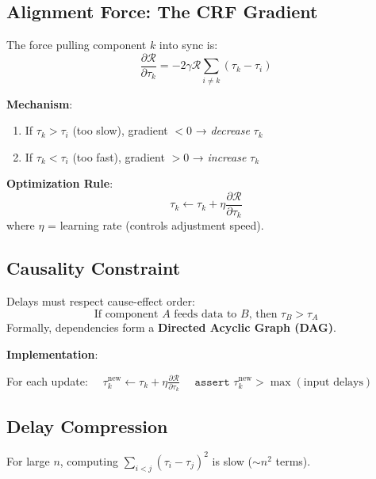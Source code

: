 \subsection{Alignment Force: The CRF Gradient}  
\begin{definition}  
The force pulling component $k$ into sync is:  
\[  
\frac{\partial \mathcal{R}}{\partial \tau_k} = -2\gamma \mathcal{R} \sum_{i \neq k} (\tau_k - \tau_i)  
\]  
\end{definition}  

\textbf{Mechanism}:  
\begin{enumerate}  
\item If $\tau_k > \tau_i$ (too slow), gradient $<0$ → \textit{decrease} $\tau_k$  
\item If $\tau_k < \tau_i$ (too fast), gradient $>0$ → \textit{increase} $\tau_k$  
\end{enumerate}  

\textbf{Optimization Rule}:  
\[  
\tau_k \leftarrow \tau_k + \eta \frac{\partial \mathcal{R}}{\partial \tau_k}  
\]  
where $\eta$ = learning rate (controls adjustment speed).  

\subsection{Causality Constraint}  
\begin{principle}  
Delays must respect cause-effect order:  
\[  
\text{If component } A \text{ feeds data to } B \text{, then } \tau_B > \tau_A  
\]  
Formally, dependencies form a \textbf{Directed Acyclic Graph (DAG)}.  
\end{principle}  

\textbf{Implementation}:  
\begin{algorithmic}  
\State For each update:  
\State $\quad \tau_k^{\text{new}} \gets \tau_k + \eta \frac{\partial \mathcal{R}}{\partial \tau_k}$  
\State $\quad \texttt{assert } \tau_k^{\text{new}} > \max(\text{input delays})$  
\end{algorithmic}  

\subsection{Delay Compression}  %
\begin{problem}  
For large $n$, computing $\sum_{i<j} (\tau_i-\tau_j)^2$ is slow ($\sim n^2$ terms).  
\end{problem}  

